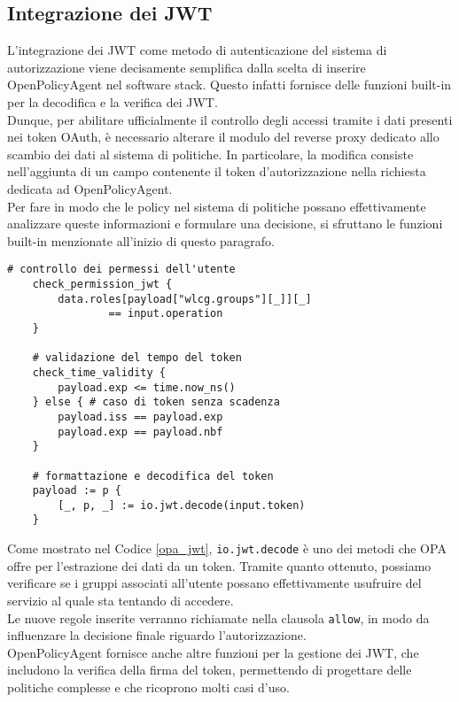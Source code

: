 \subsection{Integrazione dei JWT}
L'integrazione dei JWT come metodo di autenticazione del sistema di autorizzazione viene decisamente semplifica 
dalla scelta di inserire OpenPolicyAgent nel software stack. 
Questo infatti fornisce delle funzioni built-in per la decodifica e la verifica dei JWT.
\\ Dunque, per abilitare ufficialmente il controllo degli accessi tramite i dati presenti nei token OAuth, 
è necessario alterare il modulo del reverse proxy dedicato allo scambio dei dati al sistema di politiche. In particolare, la modifica consiste 
nell'aggiunta di un campo contenente il token d'autorizzazione nella richiesta dedicata ad OpenPolicyAgent.
\\ Per fare in modo che le policy nel sistema di politiche possano effettivamente analizzare queste informazioni e formulare una decisione, 
si sfruttano le funzioni built-in menzionate all'inizio di questo paragrafo. 
\begin{lstlisting}[caption={Esempio di regole per la gestione dei token OAuth 2.0},captionpos=b,label=opa_jwt]
    # controllo dei permessi dell'utente
    check_permission_jwt {
        data.roles[payload["wlcg.groups"][_]][_]
                == input.operation
    }
    
    # validazione del tempo del token 
    check_time_validity {
        payload.exp <= time.now_ns()
    } else { # caso di token senza scadenza
        payload.iss == payload.exp
        payload.exp == payload.nbf
    }
    
    # formattazione e decodifica del token
    payload := p {
        [_, p, _] := io.jwt.decode(input.token)
    }
\end{lstlisting}
Come mostrato nel Codice \ref{opa_jwt}, \texttt{io.jwt.decode} è uno dei metodi che OPA offre per l'estrazione dei dati da un token.
Tramite quanto ottenuto, possiamo verificare se i gruppi associati all'utente possano effettivamente usufruire del servizio al quale sta tentando di accedere.
\\ Le nuove regole inserite verranno richiamate nella clausola \texttt{allow}, in modo da influenzare la decisione finale riguardo l'autorizzazione. 
\\ OpenPolicyAgent fornisce anche altre funzioni per la gestione dei JWT, che includono la verifica della firma del token, 
permettendo di progettare delle politiche complesse e che ricoprono molti casi d'uso. 

